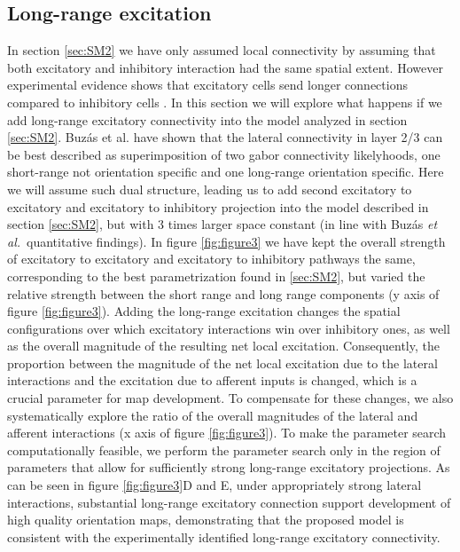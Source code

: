 \documentclass[a4paper,10pt]{article}
\newcommand{\etal}{\textit{et al.}}
\begin{document}
\subsection{Long-range excitation} \label{sec:SM3}

In section \ref{sec:SM2} we have only assumed local connectivity by assuming that both excitatory and inhibitory interaction had the same spatial extent. 
However experimental evidence shows that excitatory cells send longer connections compared to inhibitory cells \cite{Buzas2006,Budd2001}. In this section we will
explore what happens if we add long-range excitatory connectivity into the model analyzed in section \ref{sec:SM2}. Buz\'as et al. \cite{Buzas2006} have
shown that the lateral connectivity in layer 2/3 can be best described as superimposition of two gabor connectivity likelyhoods, one short-range not orientation 
specific and one long-range orientation specific. Here we will assume such dual structure, leading us to add second excitatory to excitatory and excitatory to 
inhibitory projection into the model described in section \ref{sec:SM2}, but with 3 times larger space constant (in line with Buz\'as \etal \, \cite{Buzas2006} quantitative findings). 
In figure \ref{fig:figure3} we have  kept the overall strength of excitatory to excitatory and excitatory to inhibitory pathways the same, corresponding to the best 
parametrization found in \ref{sec:SM2}, but varied the relative strength between the short range and long range components (y axis of figure \ref{fig:figure3}). 
Adding the long-range excitation changes the spatial configurations over which excitatory interactions win over inhibitory ones, as well as the 
overall magnitude of the resulting net local excitation. Consequently, the proportion between the magnitude of the net local excitation due to the lateral interactions and the excitation
due to afferent inputs is changed, which is a crucial parameter for map development. To compensate for these changes, we also systematically explore the ratio of the overall magnitudes of the lateral and afferent 
interactions (x axis of figure \ref{fig:figure3}). To make the parameter search computationally feasible, we perform the parameter search only in the region of parameters that allow for sufficiently strong
long-range excitatory projections. As can be seen in figure \ref{fig:figure3}D and E, under appropriately strong lateral interactions, substantial long-range excitatory connection support development of high quality orientation maps, demonstrating that the proposed model is consistent with the experimentally identified long-range excitatory connectivity.
\end{document}
